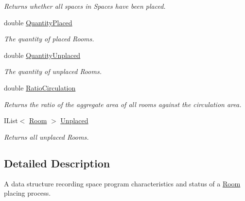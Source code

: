 \begin{DoxyCompactItemize}
\begin{DoxyCompactList}\small\item\em Returns whether all spaces in Spaces have been placed. \end{DoxyCompactList}\item 
double \mbox{\hyperlink{class_room_kit_1_1_scope_a5d7f4fe62fc696475d893790877dd1c9}{Quantity\+Placed}}
\begin{DoxyCompactList}\small\item\em The quantity of placed Rooms. \end{DoxyCompactList}\item 
double \mbox{\hyperlink{class_room_kit_1_1_scope_a4c0f9330879c8a08814243ea72b72c73}{Quantity\+Unplaced}}
\begin{DoxyCompactList}\small\item\em The quantity of unplaced Rooms. \end{DoxyCompactList}\item 
double \mbox{\hyperlink{class_room_kit_1_1_scope_a0d5784d6e9118af53345f55e1eccac4d}{Ratio\+Circulation}}
\begin{DoxyCompactList}\small\item\em Returns the ratio of the aggregate area of all rooms against the circulation area. \end{DoxyCompactList}\item 
I\+List$<$ \mbox{\hyperlink{class_room_kit_1_1_room}{Room}} $>$ \mbox{\hyperlink{class_room_kit_1_1_scope_a8dcaa9aea2885afdfd00ca6aaed03187}{Unplaced}}
\begin{DoxyCompactList}\small\item\em Returns all unplaced Rooms. \end{DoxyCompactList}\end{DoxyCompactItemize}


\subsection{Detailed Description}
A data structure recording space program characteristics and status of a \mbox{\hyperlink{class_room_kit_1_1_room}{Room}} placing process. 




